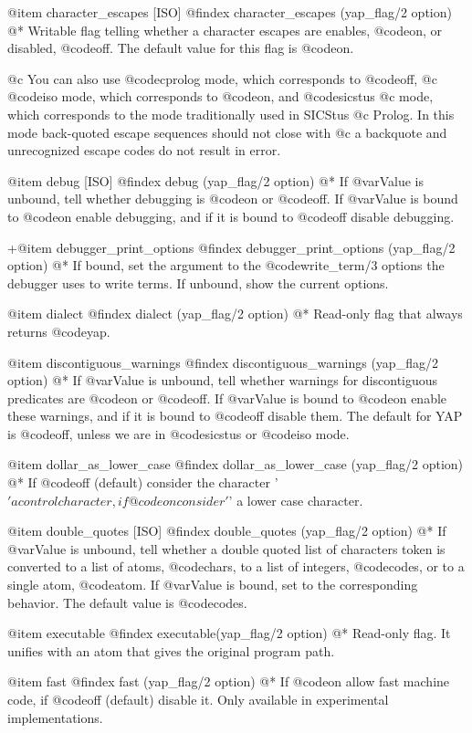 {{{{{{@item character_escapes [ISO]
@findex  character_escapes (yap_flag/2 option)
@* Writable flag telling whether a character escapes are enables,
@code{on}, or disabled, @code{off}. The default value for this flag is
@code{on}.

@c You can also use @code{cprolog} mode, which corresponds to @code{off},
@c @code{iso} mode, which corresponds to @code{on}, and @code{sicstus}
@c mode, which corresponds to the mode traditionally used in SICStus
@c Prolog. In this mode back-quoted escape sequences should not close with
@c a backquote and unrecognized escape codes do not result in error.

@item debug [ISO]
@findex debug (yap_flag/2 option)
@*
If @var{Value} is unbound, tell whether debugging is @code{on} or
@code{off}. If @var{Value} is bound to @code{on} enable debugging, and if
it is bound to @code{off} disable debugging.

+@item debugger_print_options
@findex debugger_print_options (yap_flag/2 option)
@* 
If bound, set the argument to the @code{write_term/3} options the
debugger uses to write terms. If unbound, show the current options.

@item dialect
@findex dialect (yap_flag/2 option)
@*
Read-only flag that always returns @code{yap}.

@item discontiguous_warnings
@findex discontiguous_warnings (yap_flag/2 option)
@*
If @var{Value} is unbound, tell whether warnings for discontiguous
predicates are @code{on} or
@code{off}. If @var{Value} is bound to @code{on} enable these warnings,
and if it is bound to @code{off} disable them. The default for YAP is
@code{off}, unless we are in @code{sicstus} or @code{iso} mode.

@item  dollar_as_lower_case
@findex dollar_as_lower_case (yap_flag/2 option)
@*
If @code{off} (default)  consider the character '$' a control character, if
@code{on} consider '$' a lower case character.

@item double_quotes [ISO]
@findex double_quotes (yap_flag/2 option)
@*
If @var{Value} is unbound, tell whether a double quoted list of characters
token is converted to a list of atoms, @code{chars}, to a list of integers,
@code{codes}, or to a single atom, @code{atom}. If @var{Value} is bound, set to
the corresponding behavior. The default value is @code{codes}.

@item executable
@findex executable(yap_flag/2 option)
@* Read-only flag. It unifies with an atom that gives the
original program path.

@item  fast
@findex fast (yap_flag/2 option)
@*
If @code{on} allow fast machine code, if @code{off} (default) disable it. Only
available in experimental implementations.

}}}}}}
